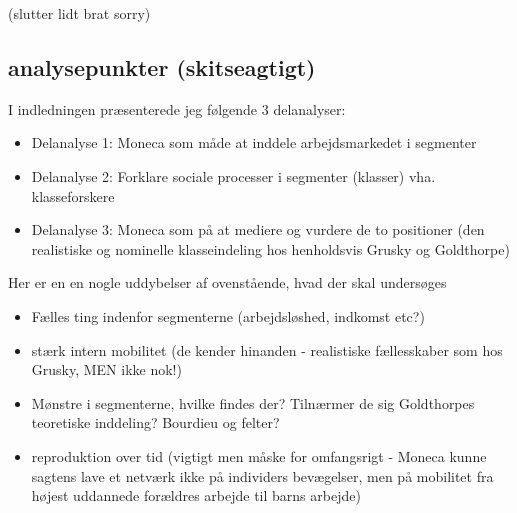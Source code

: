 (slutter lidt brat sorry)

\subsection{analysepunkter (skitseagtigt)}

I indledningen præsenterede jeg følgende 3 delanalyser:

\begin{itemize}
  \item Delanalyse 1: Moneca som måde at inddele arbejdsmarkedet i segmenter
  \item Delanalyse 2: Forklare sociale processer i segmenter (klasser) vha. klasseforskere
  \item Delanalyse 3: Moneca som på at mediere og vurdere de to positioner (den realistiske og nominelle klasseindeling hos henholdsvis Grusky og Goldthorpe)
\end{itemize}


Her er en en nogle uddybelser af ovenstående, hvad der skal undersøges

\begin{itemize}
  \item Fælles ting indenfor segmenterne (arbejdsløshed, indkomst etc?)
  \item stærk intern mobilitet (de kender hinanden - realistiske fællesskaber som hos Grusky, MEN ikke nok!)
  \item Mønstre i segmenterne, hvilke findes der? Tilnærmer de sig Goldthorpes teoretiske inddeling? Bourdieu og felter?
   \item reproduktion over tid (vigtigt men måske for omfangsrigt - Moneca kunne sagtens lave et netværk ikke på individers bevægelser, men på mobilitet fra højest uddannede forældres arbejde til barns arbejde)
\end{itemize}



